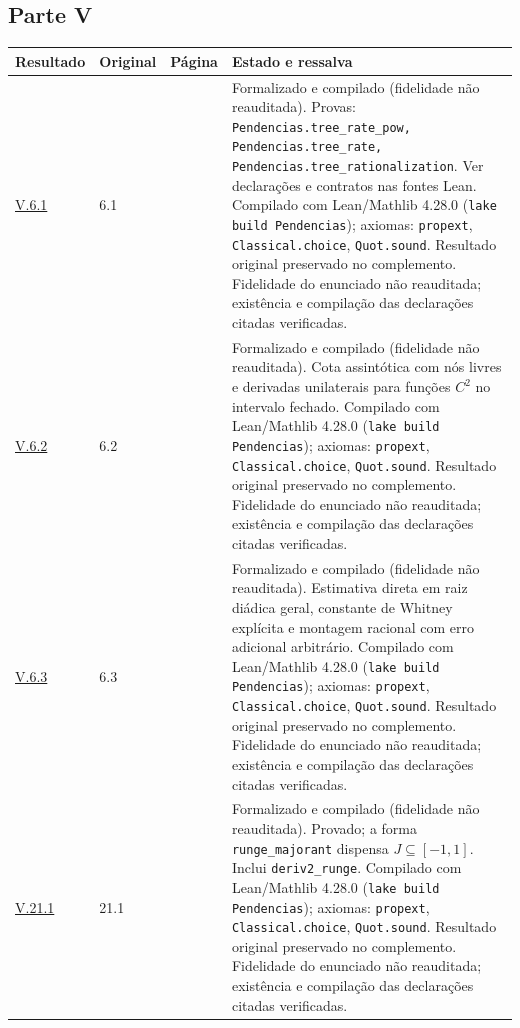 \documentclass[12pt,a4paper]{article}
\theoremstyle{preciso}
\theoremstyle{definition}
\newcommand{\code}[1]{\nolinkurl{#1}}
\theoremstyle{preciso}
\theoremstyle{preciso}
\theoremstyle{preciso}
\theoremstyle{preciso}
\theoremstyle{definition}
\theoremstyle{preciso}
\theoremstyle{definition}
\theoremstyle{preciso}
\theoremstyle{preciso}
\theoremstyle{definition}
\begin{document}
\begin{singlespace}
\subsection*{Parte V}
\small
\begin{longtable}{@{}p{.11\linewidth}p{.09\linewidth}p{.09\linewidth}p{.59\linewidth}@{}}
\toprule Resultado & Original & Página & Estado e ressalva\\\midrule\endhead
\hyperref[map:complemento_original:6.1]{V.6.1} & 6.1 & \pageref{map:complemento_original:6.1} & Formalizado e compilado (fidelidade não reauditada). Provas: \code{Pendencias.tree_rate_pow, Pendencias.tree_rate, Pendencias.tree_rationalization}. Ver declarações e contratos nas fontes Lean. Compilado com Lean/Mathlib 4.28.0 (\texttt{lake build Pendencias}); axiomas: \texttt{propext}, \texttt{Classical.choice}, \texttt{Quot.sound}. Resultado original preservado no complemento. Fidelidade do enunciado não reauditada; existência e compilação das declarações citadas verificadas.\\[4pt]
\hyperref[map:complemento_original:6.2]{V.6.2} & 6.2 & \pageref{map:complemento_original:6.2} & Formalizado e compilado (fidelidade não reauditada). Cota assintótica com nós livres e derivadas unilaterais para funções $C^2$ no intervalo fechado. Compilado com Lean/Mathlib 4.28.0 (\texttt{lake build Pendencias}); axiomas: \texttt{propext}, \texttt{Classical.choice}, \texttt{Quot.sound}. Resultado original preservado no complemento. Fidelidade do enunciado não reauditada; existência e compilação das declarações citadas verificadas.\\[4pt]
\hyperref[map:complemento_original:6.3]{V.6.3} & 6.3 & \pageref{map:complemento_original:6.3} & Formalizado e compilado (fidelidade não reauditada). Estimativa direta em raiz diádica geral, constante de Whitney explícita e montagem racional com erro adicional arbitrário. Compilado com Lean/Mathlib 4.28.0 (\texttt{lake build Pendencias}); axiomas: \texttt{propext}, \texttt{Classical.choice}, \texttt{Quot.sound}. Resultado original preservado no complemento. Fidelidade do enunciado não reauditada; existência e compilação das declarações citadas verificadas.\\[4pt]
\hyperref[map:complemento_original:21.1]{V.21.1} & 21.1 & \pageref{map:complemento_original:21.1} & Formalizado e compilado (fidelidade não reauditada). Provado; a forma \texttt{runge\_majorant} dispensa $J\subseteq[-1,1]$. Inclui \texttt{deriv2\_runge}. Compilado com Lean/Mathlib 4.28.0 (\texttt{lake build Pendencias}); axiomas: \texttt{propext}, \texttt{Classical.choice}, \texttt{Quot.sound}. Resultado original preservado no complemento. Fidelidade do enunciado não reauditada; existência e compilação das declarações citadas verificadas.\\[4pt]
\bottomrule\end{longtable}\normalsize
\end{singlespace}
\end{document}
